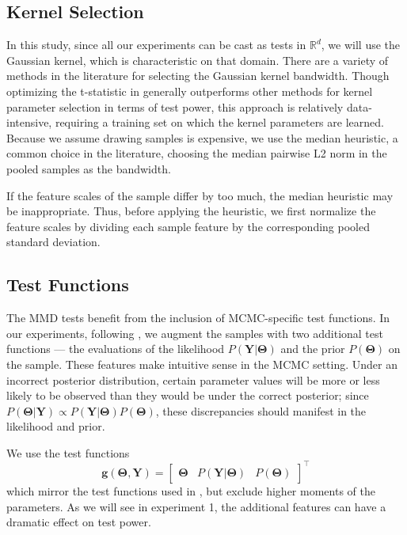 \documentclass[a4paper,11pt]{article}
\begin{document}
\subsection{Kernel Selection}
In this study, since all our experiments can be cast as tests in $\mathbb{R}^{d}$, we will use the Gaussian kernel, which is characteristic on that domain. There are a variety of methods in the literature for selecting the Gaussian kernel bandwidth. Though optimizing the t-statistic in \cite{sutherland_generative_2019} generally outperforms other methods for kernel parameter selection in terms of test power, this approach is relatively data-intensive, requiring a training set on which the kernel parameters are learned. Because we assume drawing samples is expensive, we use the median heuristic, a common choice in the literature, choosing the median pairwise L2 norm in the pooled samples as the bandwidth.

If the feature scales of the sample differ by too much, the median heuristic may be inappropriate. Thus, before applying the heuristic, we first normalize the feature scales by dividing each sample feature by the corresponding pooled standard deviation.

\subsection{Test Functions}
\label{section:testfn}
The MMD tests benefit from the inclusion of MCMC-specific test functions. In our experiments, following \cite{gandy_unit_2020}, we augment the samples with two additional test functions --- the evaluations of the likelihood $P(\mathbf{Y}|\mathbf{\Theta})$ and the prior $P(\mathbf{\Theta})$ on the sample. These features make intuitive sense in the MCMC setting. Under an incorrect posterior distribution, certain parameter values will be more or less likely to be observed than they would be under the correct posterior; since $P(\mathbf{\Theta}|\mathbf{Y}) \propto P(\mathbf{Y}|\mathbf{\Theta}) P(\mathbf{\Theta})$, these discrepancies should manifest in the likelihood and prior.

We use the test functions
\begin{equation}
    \mathbf{g}(\mathbf{\Theta}, \mathbf{Y}) = \begin{bmatrix} \mathbf{\Theta} & P(\mathbf{Y}|\mathbf{\Theta}) & P(\mathbf{\Theta}) \end{bmatrix}^{\top}
    \label{eq:testfn}
\end{equation}
which mirror the test functions used in \cite{gandy_unit_2020}, but exclude higher moments of the parameters. As we will see in experiment 1, the additional features can have a dramatic effect on test power.
\end{document}

